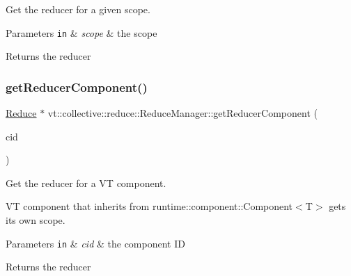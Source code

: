 Get the reducer for a given scope. 


\begin{DoxyParams}[1]{Parameters}
\mbox{\tt in}  & {\em scope} & the scope\\
\hline
\end{DoxyParams}
\begin{DoxyReturn}{Returns}
the reducer 
\end{DoxyReturn}
\mbox{\label{structvt_1_1collective_1_1reduce_1_1_reduce_manager_ae154a987a32dfa8c86e0391a2915579d}} 
\subsubsection{\texorpdfstring{get\+Reducer\+Component()}{getReducerComponent()}}
{\footnotesize\ttfamily \hyperlink{structvt_1_1collective_1_1reduce_1_1_reduce}{Reduce} $\ast$ vt\+::collective\+::reduce\+::\+Reduce\+Manager\+::get\+Reducer\+Component (\begin{DoxyParamCaption}\item[{\hyperlink{namespacevt_ab6ac935c168b809c422d5121da4f2700}{Component\+I\+D\+Type} const \&}]{cid }\end{DoxyParamCaption})}



Get the reducer for a VT component. 

VT component that inherits from {\ttfamily runtime\+::component\+::\+Component$<$\+T$>$} gets its own scope.


\begin{DoxyParams}[1]{Parameters}
\mbox{\tt in}  & {\em cid} & the component ID\\
\hline
\end{DoxyParams}
\begin{DoxyReturn}{Returns}
the reducer 
\end{DoxyReturn}
\mbox{\label{structvt_1_1collective_1_1reduce_1_1_reduce_manager_afedfe0dbb9fcbe6120a310ac8f4ad9b0}} 
